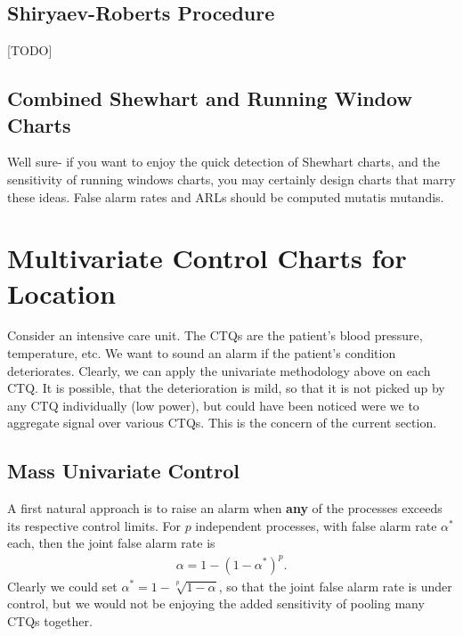 \subsection{Shiryaev-Roberts Procedure}
[TODO]





\subsection{Combined Shewhart and Running Window Charts}
Well sure- if you want to enjoy the quick detection of Shewhart charts, and the sensitivity of running windows charts, you may certainly design charts that marry these ideas.
False alarm rates and ARLs should be computed mutatis mutandis.







\section[Multivariate]{Multivariate Control Charts for Location}
\label{sec:multivariate}

\begin{example}
\label{eg:intensive}
Consider an intensive care unit. 
The CTQs are the patient's blood pressure, temperature, etc.
We want to sound an alarm if the patient's condition deteriorates. 
Clearly, we can apply the univariate methodology above on each CTQ.
It is possible, that the deterioration is mild, so that it is not picked up by any CTQ individually (low power), but could have been noticed were we to aggregate signal over various CTQs. 
This is the concern of the current section. 
\end{example}


\subsection{Mass Univariate Control}
\label{sec:mass_univariate}

A first natural approach is to raise an alarm when \textbf{any} of the processes exceeds its respective control limits.
For $p$ independent processes, with false alarm rate $\alpha^*$ each, then the joint false alarm rate is 
\begin{align}
	\alpha = 1-(1-\alpha^*)^p.
\end{align}
Clearly we could set $\alpha^*=1-\sqrt[p]{1-\alpha}$, so that the joint false alarm rate is under control, but we would not be enjoying the added sensitivity of pooling many CTQs together. 



